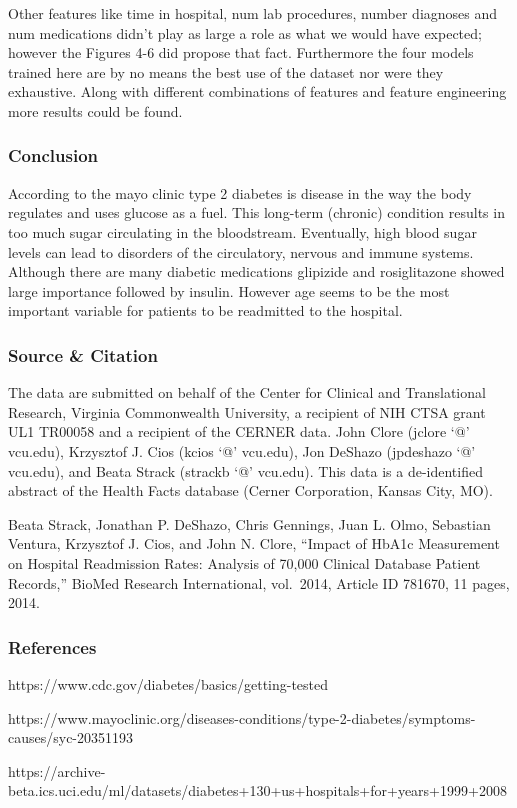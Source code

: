\documentclass[5p]{elsarticle} %
\begin{document}
Other features like time in hospital, num lab procedures, number
diagnoses and num medications didn't play as large a role as what we
would have expected; however the Figures 4-6 did propose that fact.
Furthermore the four models trained here are by no means the best use of
the dataset nor were they exhaustive. Along with different combinations
of features and feature engineering more results could be found.

\hypertarget{conclusion}{%
\subsubsection{Conclusion}\label{conclusion}}

According to the mayo clinic type 2 diabetes is disease in the way the
body regulates and uses glucose as a fuel. This long-term (chronic)
condition results in too much sugar circulating in the bloodstream.
Eventually, high blood sugar levels can lead to disorders of the
circulatory, nervous and immune systems. Although there are many
diabetic medications glipizide and rosiglitazone showed large importance
followed by insulin. However age seems to be the most important variable
for patients to be readmitted to the hospital.

\hypertarget{source-citation}{%
\subsubsection{Source \& Citation}\label{source-citation}}

The data are submitted on behalf of the Center for Clinical and
Translational Research, Virginia Commonwealth University, a recipient of
NIH CTSA grant UL1 TR00058 and a recipient of the CERNER data. John
Clore (jclore `@' vcu.edu), Krzysztof J. Cios (kcios `@' vcu.edu), Jon
DeShazo (jpdeshazo `@' vcu.edu), and Beata Strack (strackb `@' vcu.edu).
This data is a de-identified abstract of the Health Facts database
(Cerner Corporation, Kansas City, MO).

Beata Strack, Jonathan P. DeShazo, Chris Gennings, Juan L. Olmo,
Sebastian Ventura, Krzysztof J. Cios, and John N. Clore, ``Impact of
HbA1c Measurement on Hospital Readmission Rates: Analysis of 70,000
Clinical Database Patient Records,'' BioMed Research International,
vol.~2014, Article ID 781670, 11 pages, 2014.

\hypertarget{references}{%
\subsubsection{References}\label{references}}

https://www.cdc.gov/diabetes/basics/getting-tested

https://www.mayoclinic.org/diseases-conditions/type-2-diabetes/symptoms-causes/syc-20351193

https://archive-beta.ics.uci.edu/ml/datasets/diabetes+130+us+hospitals+for+years+1999+2008
\end{document}
